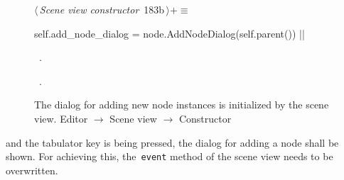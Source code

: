 \documentclass[%
    a4paper,    %
    justified,  %
    nobib,      %
    openany     %
]{tufte-book}
\makeatletter
\renewcommand{\label}[1]{\@tufte@label{##1}}%
\makeatother
\begin{document}
\begin{figure}[!htbp]
\begin{flushleft} \small
\begin{minipage}{\linewidth}\label{scrap156}\raggedright\small
{} $\langle\,${\itshape Scene view constructor}\nobreak\ {\footnotesize {183b}}$\,\rangle+\equiv$
\vspace{-1ex}
\begin{pythoncode}
    self.add_node_dialog = node.AddNodeDialog(self.parent())
|\NWsep|
\end{pythoncode}
\vspace{1.5ex}
\footnotesize
\begin{list}{}{\setlength{\itemsep}{-\parsep}\setlength{\itemindent}{-\leftmargin}}
\item \NWtxtMacroDefBy\ .
\item \NWtxtMacroRefIn\ .

\item{}
\end{list}
\end{minipage}\vspace{4ex}
\end{flushleft}
\caption{The dialog for adding new node instances is initialized by the scene
  view.
  \newline{}\newline{}Editor $\rightarrow$ Scene view $\rightarrow$ Constructor}
\end{figure}

 and the tabulator key is being
pressed, the dialog for adding a node shall be shown. For achieving this,
the~\verb=event= method of the scene view needs to be overwritten.
\end{document}
